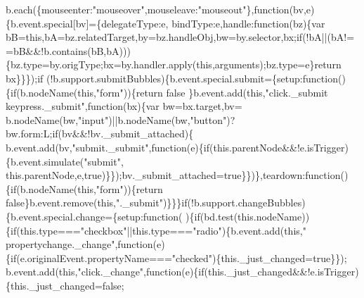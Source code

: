 \begin{DoxyCode}
      b.each(\{mouseenter:\textcolor{stringliteral}{"mouseover"},mouseleave:\textcolor{stringliteral}{"mouseout"}\},\textcolor{keyword}{function}(bv,e)\{b.event.special[bv]=\{delegateType:e,
      bindType:e,handle:\textcolor{keyword}{function}(bz)\{var bB=\textcolor{keyword}{this},bA=bz.relatedTarget,by=bz.handleObj,bw=by.selector,bx;\textcolor{keywordflow}{if}(!bA||(bA!=
      =bB&&!b.contains(bB,bA)))\{bz.type=by.origType;bx=by.handler.apply(\textcolor{keyword}{this},arguments);bz.type=e\}\textcolor{keywordflow}{return} bx\}\}\});\textcolor{keywordflow}{if}
      (!b.support.submitBubbles)\{b.event.special.submit=\{setup:\textcolor{keyword}{function}()\{\textcolor{keywordflow}{if}(b.nodeName(\textcolor{keyword}{this},\textcolor{stringliteral}{"form"}))\{\textcolor{keywordflow}{return} \textcolor{keyword}{false}
\}b.event.add(\textcolor{keyword}{this},\textcolor{stringliteral}{"click.\_submit keypress.\_submit"},\textcolor{keyword}{function}(bx)\{var bw=bx.target,bv=
      b.nodeName(bw,\textcolor{stringliteral}{"input"})||b.nodeName(bw,\textcolor{stringliteral}{"button"})?bw.form:L;\textcolor{keywordflow}{if}(bv&&!bv.\_submit\_attached)\{
      b.event.add(bv,\textcolor{stringliteral}{"submit.\_submit"},\textcolor{keyword}{function}(e)\{\textcolor{keywordflow}{if}(this.parentNode&&!e.isTrigger)\{b.event.simulate(\textcolor{stringliteral}{"submit"},\textcolor{keyword}{
      this}.parentNode,e,\textcolor{keyword}{true})\}\});bv.\_submit\_attached=\textcolor{keyword}{true}\}\})\},teardown:\textcolor{keyword}{function}()\{\textcolor{keywordflow}{if}(b.nodeName(\textcolor{keyword}{this},\textcolor{stringliteral}{"form"}))\{\textcolor{keywordflow}{return} \textcolor{keyword}{
      false}\}b.event.remove(\textcolor{keyword}{this},\textcolor{stringliteral}{".\_submit"})\}\}\}\textcolor{keywordflow}{if}(!b.support.changeBubbles)\{b.event.special.change=\{setup:\textcolor{keyword}{function}(
      )\{\textcolor{keywordflow}{if}(bd.test(\textcolor{keyword}{this}.nodeName))\{\textcolor{keywordflow}{if}(this.type===\textcolor{stringliteral}{"checkbox"}||this.type===\textcolor{stringliteral}{"radio"})\{b.event.add(\textcolor{keyword}{this},\textcolor{stringliteral}{"
      propertychange.\_change"},\textcolor{keyword}{function}(e)\{\textcolor{keywordflow}{if}(e.originalEvent.propertyName===\textcolor{stringliteral}{"checked"})\{\textcolor{keyword}{this}.\_just\_changed=\textcolor{keyword}{true}\}\});
      b.event.add(\textcolor{keyword}{this},\textcolor{stringliteral}{"click.\_change"},\textcolor{keyword}{function}(e)\{\textcolor{keywordflow}{if}(this.\_just\_changed&&!e.isTrigger)\{\textcolor{keyword}{this}.\_just\_changed=\textcolor{keyword}{false};

\end{DoxyCode}
